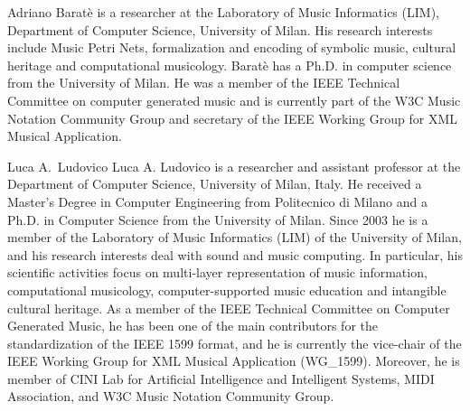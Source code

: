 \documentclass[journal]{IEEEtran}
\begin{document}
\begin{IEEEbiography}{Adriano Barat\`{e}} is a researcher at the Laboratory of Music Informatics (LIM), Department of Computer Science, University of Milan. His research interests include Music Petri Nets, formalization and encoding of symbolic music, cultural heritage and computational musicology. Baratè has a Ph.D. in computer science from the University of Milan. He was a member of the IEEE Technical Committee on computer generated music and is currently part of the W3C Music Notation Community Group and secretary of the IEEE Working Group for XML Musical Application.
\end{IEEEbiography}

\begin{IEEEbiography}{Luca A.\ Ludovico} Luca A. Ludovico is a researcher and assistant professor at the Department of Computer Science, University of Milan, Italy. He received a Master's Degree in Computer Engineering from Politecnico di Milano and a Ph.D. in Computer Science from the University of Milan. Since 2003 he is a member of the Laboratory of Music Informatics (LIM) of the University of Milan, and his research interests deal with sound and music computing. In particular, his scientific activities focus on multi-layer representation of music information, computational musicology, computer-supported music education and intangible cultural heritage. As a member of the IEEE Technical Committee on Computer Generated Music, he has been one of the main contributors for the standardization of the IEEE 1599 format, and he is currently the vice-chair of the IEEE Working Group for XML Musical Application (WG\_1599). Moreover, he is member of CINI Lab for Artificial Intelligence and Intelligent Systems, MIDI Association, and W3C Music Notation Community Group.
\end{IEEEbiography}
\end{document}

